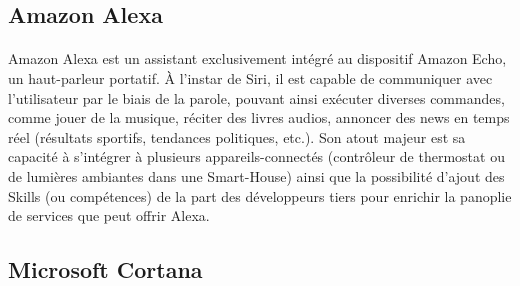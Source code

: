 \subsection{Amazon Alexa}\label{alexa}
\paragraph{}Amazon Alexa est un assistant exclusivement intégré au dispositif Amazon Echo, un haut-parleur portatif. À l'instar de Siri, il est capable de communiquer avec l'utilisateur par le biais de la parole, pouvant ainsi exécuter diverses commandes, comme jouer de la musique, réciter des livres audios, annoncer des news en temps réel (résultats sportifs, tendances politiques, etc.). Son atout majeur est sa capacité à s'intégrer à plusieurs appareils-connectés (contrôleur de thermostat ou de lumières ambiantes dans une Smart-House) ainsi que la possibilité d'ajout des Skills (ou compétences) de la part des développeurs tiers pour enrichir la panoplie de services que peut offrir Alexa.


\subsection{Microsoft Cortana}
